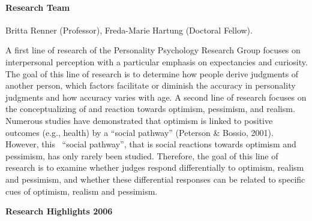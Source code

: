 
\paragraph{Research Team}
Britta Renner (Professor), Freda-Marie Hartung (Doctoral Fellow).

 A first line of research of the Personality Psychology Research Group focuses on interpersonal perception with a particular emphasis on expectancies and curiosity. The goal of this line of research is to determine how people derive judgments of another person, which factors facilitate or diminish the accuracy in personality judgments and how accuracy varies with age. 
A second line of research focuses on the conceptualizing of and reaction towards optimism, pessimism, and realism. Numerous studies have demonstrated that optimism is linked to positive outcomes (e.g., health) by a ``social pathway'' (Peterson \& Bossio, 2001). However, this \
``social pathway'', that is social reactions towards optimism and pessimism, has only rarely been studied. Therefore, the goal of this line of research is to examine whether judges respond differentially to optimism, realism and pessimism, and whether these differential responses can be related to specific cues of optimism, realism and pessimism.

\null
\textbf{Research Highlights 2006}

